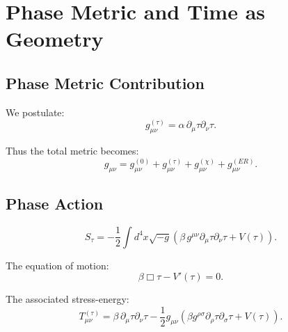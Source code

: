 \chapter{Phase Metric and Time as Geometry}

\section{Phase Metric Contribution}

We postulate:
\[
g^{(\tau)}_{\mu\nu}
=
\alpha\, \partial_\mu \tau \partial_\nu \tau.
\]

Thus the total metric becomes:
\[
g_{\mu\nu} 
= 
g^{(0)}_{\mu\nu}
+ g^{(\tau)}_{\mu\nu}
+ g^{(\chi)}_{\mu\nu}
+ g^{(ER)}_{\mu\nu}.
\]

\section{Phase Action}

\[
S_\tau
=
-\frac{1}{2}\int d^4x \sqrt{-g}\left(
\beta\, g^{\mu\nu}\partial_\mu\tau\partial_\nu\tau
+ V(\tau)
\right).
\]

The equation of motion:
\[
\beta \Box \tau - V'(\tau) = 0.
\]

The associated stress-energy:
\[
T^{(\tau)}_{\mu\nu}
=
\beta\, \partial_\mu\tau\partial_\nu\tau
-\frac{1}{2}g_{\mu\nu}
\left(
\beta g^{\rho\sigma}\partial_\rho\tau\partial_\sigma\tau
+ V(\tau)
\right).
\]


